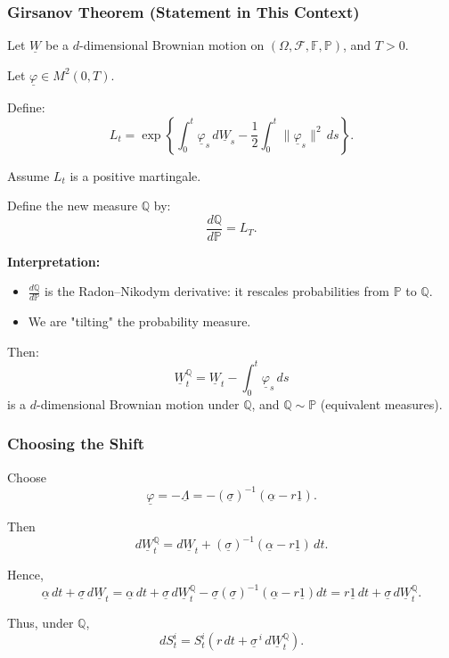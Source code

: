\documentclass[12pt,a4paper]{article}
\theoremstyle{definition}
\begin{document}
\subsubsection{Girsanov Theorem (Statement in This Context)}

Let $\underline{W}$ be a $d$-dimensional Brownian motion on $(\Omega, \mathcal{F}, \mathbb{F}, \mathbb{P})$, and $T > 0$.

Let $\underline{\varphi} \in M^2(0, T)$.

Define:
\[
L_t = \exp\left\{\int_0^t \underline{\varphi}_s \, d\underline{W}_s - \frac{1}{2} \int_0^t \|\underline{\varphi}_s\|^2 \, ds\right\}.
\]

Assume $L_t$ is a positive martingale.

Define the new measure $\mathbb{Q}$ by:
\[
\frac{d\mathbb{Q}}{d\mathbb{P}} = L_T.
\]

\textbf{Interpretation:}
\begin{itemize}
\item $\frac{d\mathbb{Q}}{d\mathbb{P}}$ is the Radon--Nikodym derivative: it rescales probabilities from $\mathbb{P}$ to $\mathbb{Q}$.
\item We are "tilting" the probability measure.
\end{itemize}

Then:
\[
\underline{W}_t^\mathbb{Q} = \underline{W}_t - \int_0^t \underline{\varphi}_s \, ds
\]
is a $d$-dimensional Brownian motion under $\mathbb{Q}$, and $\mathbb{Q} \sim \mathbb{P}$ (equivalent measures).

\subsubsection{Choosing the Shift}

Choose
\[
\underline{\varphi} = -\underline{\Lambda} = -(\underline{\sigma})^{-1} (\underline{\alpha} - r\underline{1}).
\]

Then
\[
d\underline{W}_t^\mathbb{Q} = d\underline{W}_t + (\underline{\sigma})^{-1} (\underline{\alpha} - r\underline{1}) \, dt.
\]

Hence,
\[
\underline{\alpha} \, dt + \underline{\sigma} \, d\underline{W}_t = \underline{\alpha} \, dt + \underline{\sigma} \, d\underline{W}_t^\mathbb{Q} - \underline{\sigma}(\underline{\sigma})^{-1} (\underline{\alpha} - r\underline{1}) dt = r\underline{1} \, dt + \underline{\sigma} \, d\underline{W}_t^\mathbb{Q}.
\]

Thus, under $\mathbb{Q}$,
\[
dS_t^i = S_t^i(r \, dt + \underline{\sigma}^{\,i} \, d\underline{W}_t^\mathbb{Q}).
\]
\end{document}
